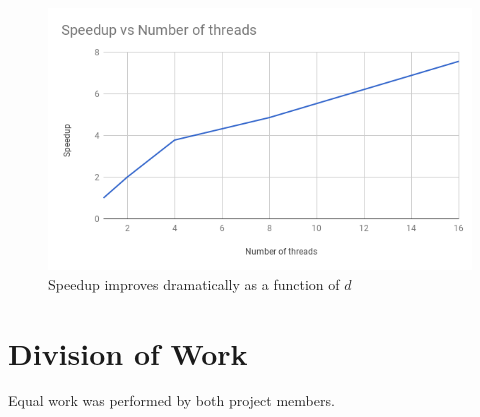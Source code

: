 \documentclass[12pt]{article}
\begin{document}
\begin{figure}[ht]
\centering
\label{speedup-vs-threads}
\includegraphics[scale=0.7]{speedup-vs-threads}
\caption{Speedup improves dramatically as a function of $d$}
\end{figure}

\section{Division of Work}
Equal work was performed by both project members. 



\end{document}
